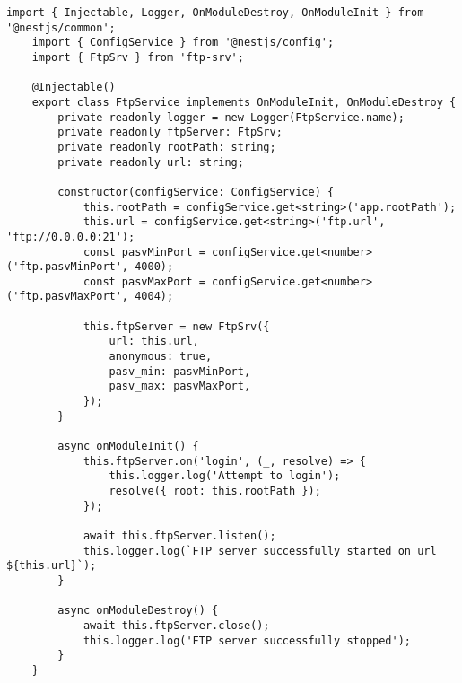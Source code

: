 \begin{lstlisting}[caption={ftp.service.ts}]
	import { Injectable, Logger, OnModuleDestroy, OnModuleInit } from '@nestjs/common';
	import { ConfigService } from '@nestjs/config';
	import { FtpSrv } from 'ftp-srv';
	
	@Injectable()
	export class FtpService implements OnModuleInit, OnModuleDestroy {
		private readonly logger = new Logger(FtpService.name);
		private readonly ftpServer: FtpSrv;
		private readonly rootPath: string;
		private readonly url: string;
		
		constructor(configService: ConfigService) {
			this.rootPath = configService.get<string>('app.rootPath');
			this.url = configService.get<string>('ftp.url', 'ftp://0.0.0.0:21');
			const pasvMinPort = configService.get<number>('ftp.pasvMinPort', 4000);
			const pasvMaxPort = configService.get<number>('ftp.pasvMaxPort', 4004);
			
			this.ftpServer = new FtpSrv({
				url: this.url,
				anonymous: true,
				pasv_min: pasvMinPort,
				pasv_max: pasvMaxPort,
			});
		}
		
		async onModuleInit() {
			this.ftpServer.on('login', (_, resolve) => {
				this.logger.log('Attempt to login');
				resolve({ root: this.rootPath });
			});
			
			await this.ftpServer.listen();
			this.logger.log(`FTP server successfully started on url ${this.url}`);
		}
		
		async onModuleDestroy() {
			await this.ftpServer.close();
			this.logger.log('FTP server successfully stopped');
		}
	}
\end{lstlisting}
